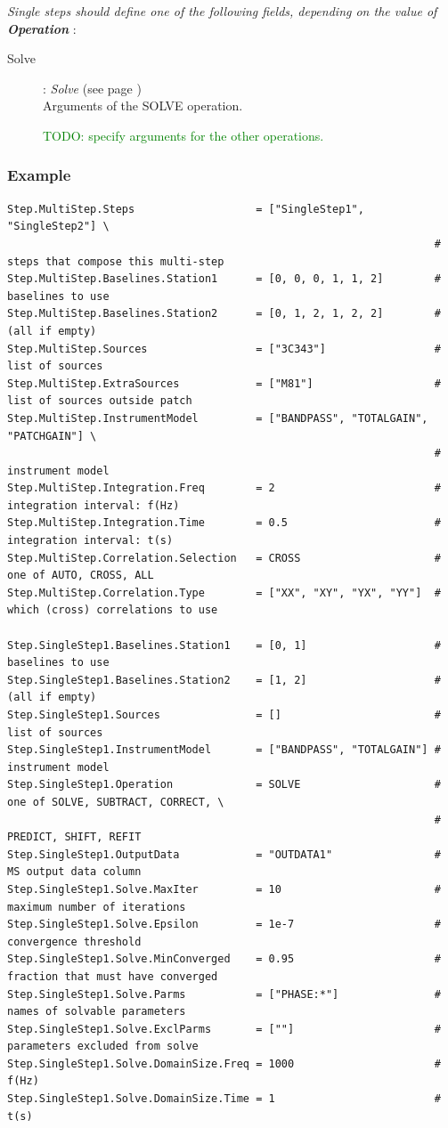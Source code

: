 \documentclass[10pt]{lofar}
\begin{document}
\emph{Single steps should define one of the following fields, depending on the
value of \textbf{Operation}} :
\begin{description}
\item [Solve] : \emph{Solve} (see page \pageref{app-solve}) \\
    Arguments of the SOLVE operation. \par
    \textcolor{green}{TODO: specify arguments for the other operations.}
\end{description}

\subsubsection*{Example}
{\footnotesize
\begin{verbatim}
Step.MultiStep.Steps                   = ["SingleStep1", "SingleStep2"] \
                                                                   # steps that compose this multi-step
Step.MultiStep.Baselines.Station1      = [0, 0, 0, 1, 1, 2]        # baselines to use
Step.MultiStep.Baselines.Station2      = [0, 1, 2, 1, 2, 2]        # (all if empty)
Step.MultiStep.Sources                 = ["3C343"]                 # list of sources
Step.MultiStep.ExtraSources            = ["M81"]                   # list of sources outside patch
Step.MultiStep.InstrumentModel         = ["BANDPASS", "TOTALGAIN", "PATCHGAIN"] \ 
                                                                   # instrument model
Step.MultiStep.Integration.Freq        = 2                         # integration interval: f(Hz)
Step.MultiStep.Integration.Time        = 0.5                       # integration interval: t(s)
Step.MultiStep.Correlation.Selection   = CROSS                     # one of AUTO, CROSS, ALL
Step.MultiStep.Correlation.Type        = ["XX", "XY", "YX", "YY"]  # which (cross) correlations to use

Step.SingleStep1.Baselines.Station1    = [0, 1]                    # baselines to use
Step.SingleStep1.Baselines.Station2    = [1, 2]                    # (all if empty)
Step.SingleStep1.Sources               = []                        # list of sources
Step.SingleStep1.InstrumentModel       = ["BANDPASS", "TOTALGAIN"] # instrument model
Step.SingleStep1.Operation             = SOLVE                     # one of SOLVE, SUBTRACT, CORRECT, \
                                                                   # PREDICT, SHIFT, REFIT
Step.SingleStep1.OutputData            = "OUTDATA1"                # MS output data column
Step.SingleStep1.Solve.MaxIter         = 10                        # maximum number of iterations
Step.SingleStep1.Solve.Epsilon         = 1e-7                      # convergence threshold
Step.SingleStep1.Solve.MinConverged    = 0.95                      # fraction that must have converged
Step.SingleStep1.Solve.Parms           = ["PHASE:*"]               # names of solvable parameters
Step.SingleStep1.Solve.ExclParms       = [""]                      # parameters excluded from solve
Step.SingleStep1.Solve.DomainSize.Freq = 1000                      # f(Hz)
Step.SingleStep1.Solve.DomainSize.Time = 1                         # t(s)


\end{verbatim}}
\end{document}
